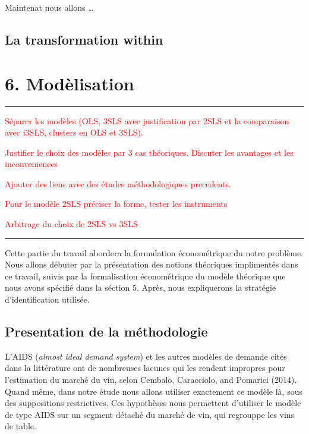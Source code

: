 \documentclass[11pt,]{article}
\begin{document}
Maintenat nous allons \ldots{}

\hypertarget{la-transformation-within}{%
\subsection{\texorpdfstring{La transformation
\textbf{within}}{La transformation within}}\label{la-transformation-within}}

\hypertarget{modelisation}{%
\section{6. Modèlisation}\label{modelisation}}

\noindent

\rule[0.5ex]{\linewidth}{1pt}

\textcolor{red}{Séparer les modèles (OLS, 3SLS avec justification par 2SLS et la comparaison avec i3SLS, clusters en OLS et 3SLS).}

\textcolor{red}{Justifier le choix des modèles par 3 cas théoriques. Discuter les avantages et les inconveniences}

\textcolor{red}{Ajouter des liens avec des études méthodologiques precedents.}

\textcolor{red}{Pour le modèle 2SLS préciser la forme, tester les instruments}

\textcolor{red}{Arbitrage du choix de 2SLS vs 3SLS}

\noindent

\rule[0.5ex]{\linewidth}{1pt}

Cette partie du travail abordera la formulation économétrique du notre
problème. Nous allons débuter par la présentation des notions théoriques
implimentés dans ce travail, suivis par la formalisation économétrique
du modèle théorique que nous avons spécifié dans la séction 5. Après,
nous expliquerons la stratégie d'identification utilisée.

\hypertarget{presentation-de-la-methodologie}{%
\subsection{Presentation de la
méthodologie}\label{presentation-de-la-methodologie}}

L'AIDS (\emph{almost ideal demand system}) et les autres modèles de
demande cités dans la littérature ont de nombreuses lacunes qui les
rendent impropres pour l'estimation du marché du vin, selon Cembalo,
Caracciolo, and Pomarici (2014). Quand même, dans notre étude nous
allons utiliser exactement ce modèle là, sous des suppositions
restrictives. Ces hypothèses nous permettent d'utiliser le modèle de
type AIDS sur un segment détaché du marché de vin, qui regrouppe les
vins de table.
\end{document}
